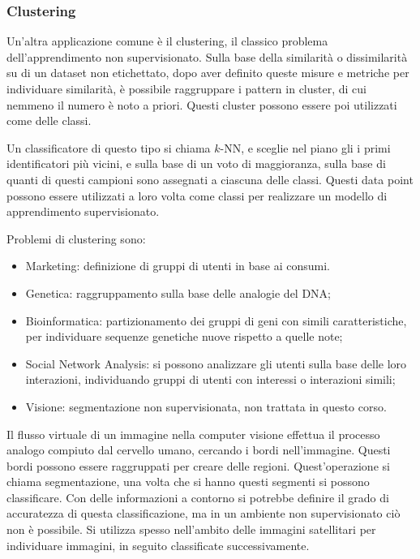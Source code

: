 \documentclass{article}
\numberwithin{equation}{subsection}
\begin{document}
\subsubsection{Clustering}

Un'altra applicazione comune è il clustering, il classico problema dell'apprendimento non 
supervisionato. Sulla base della similarità o dissimilarità su di un dataset non etichettato, dopo aver definito queste misure e metriche per individuare similarità, è 
possibile raggruppare i pattern in cluster, di cui nemmeno il numero è noto a priori. Questi 
cluster possono essere poi utilizzati come delle classi. 

Un classificatore di questo tipo si chiama $k$-NN, e sceglie nel piano gli i primi identificatori più vicini, e sulla base di un voto di maggioranza, sulla base di quanti di questi campioni sono assegnati a ciascuna delle classi. 
Questi data point possono essere utilizzati a loro volta come classi per realizzare un 
modello di apprendimento supervisionato. 

Problemi di clustering sono:
\begin{itemize}
    \item Marketing: definizione di gruppi di utenti in base ai consumi. 
    \item Genetica: raggruppamento sulla base delle analogie del DNA;
    \item Bioinformatica: partizionamento dei gruppi di geni con simili caratteristiche, per individuare sequenze genetiche nuove rispetto a quelle note;
    \item Social Network Analysis: si possono analizzare gli utenti sulla base delle loro interazioni, individuando gruppi di utenti con interessi o interazioni simili; 
    \item Visione: segmentazione non supervisionata, non trattata in questo corso. 
\end{itemize}

Il flusso virtuale di un immagine nella computer visione effettua il processo analogo 
compiuto dal cervello umano, cercando i bordi nell'immagine. Questi bordi possono essere 
raggruppati per creare delle regioni. Quest'operazione si chiama segmentazione, una volta 
che si hanno questi segmenti si possono classificare. Con delle informazioni a contorno si potrebbe definire il grado di accuratezza di questa classificazione, ma in un ambiente non supervisionato ciò non è possibile. Si utilizza spesso nell'ambito delle immagini satellitari per individuare immagini, in seguito classificate successivamente. 
\end{document}
